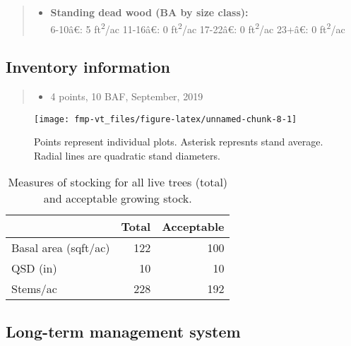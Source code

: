 \documentclass[]{tufte-handout}
\newcommand{\euro}{€}
\providecommand{\tightlist}{%
  \setlength{\itemsep}{0pt}\setlength{\parskip}{0pt}}
\begin{document}
\begin{quote}
\begin{itemize}
\tightlist
\item
  \textbf{Standing dead wood (BA by size class):}\\
  \vspace{2pt} 6-10â\euro{}: 5 ft\textsuperscript{2}/ac \textbar{}
  11-16â\euro{}: 0 ft\textsuperscript{2}/ac \textbar{} 17-22â\euro{}:
  0 ft\textsuperscript{2}/ac \textbar{} 23+â\euro{}: 0
  ft\textsuperscript{2}/ac
\end{itemize}
\end{quote}

\subsection{Inventory information}\label{inventory-information-1}

\begin{quote}
\begin{itemize}
\tightlist
\item
  4 points, 10 BAF, September, 2019
\end{itemize}
\end{quote}

\begin{figure}
\texttt{[image: fmp-vt\_files/figure-latex/unnamed-chunk-8-1]} \caption[Points represent individual plots]{Points represent individual plots. Asterisk represnts stand average. Radial lines are quadratic stand diameters.}\label{fig:unnamed-chunk-8}
\end{figure}

\begin{table}

\caption{\label{tab:unnamed-chunk-9}Measures of stocking for all live trees (total) and acceptable growing stock.}
\centering
\begin{tabular}[t]{lrr}
\toprule
  & Total & Acceptable\\
\midrule
Basal area (sqft/ac) & 122 & 100\\
QSD (in) & 10 & 10\\
Stems/ac & 228 & 192\\
\bottomrule
\end{tabular}
\end{table}

\subsection{Long-term management
system}\label{long-term-management-system-1}
\end{document}
